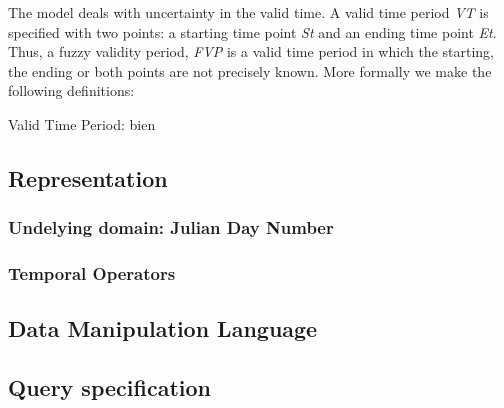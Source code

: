 %
%
The model deals with uncertainty in the valid time. A valid time period  \emph{VT} is specified with two points: a starting time point \emph{St} and an ending time point \emph{Et}. Thus, a fuzzy validity period, \emph{FVP} is a valid time period in which the starting, the ending or both points are not precisely known. More formally we make the following definitions:

\begin{definition}
Valid Time Period: bien
\end{definition}

\subsection{Representation}

\subsubsection{Undelying domain: Julian Day Number}

\subsubsection{Temporal Operators}

\subsection{Data Manipulation Language}




\subsection{Query specification}

\begin{example}

\end{example}